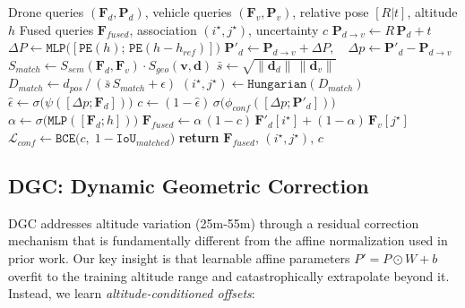 \documentclass[9.5pt,twocolumn,a4paper]{IEEEtran}
\def\mb#1{\mathbf{#1}}
\def\msc#1{\texttt{#1}}
\begin{document}
\begin{algorithm}[tb]
\caption{DGC + UGIM forward pass for one cooperative frame. Note the ordering: the altitude-aware correction (line 3) precedes association (line 6).}
\label{alg:pipeline}
\begin{algorithmic}[1]
\REQUIRE Drone queries $(\mb{F}_d, \mb{P}_d)$, vehicle queries $(\mb{F}_v, \mb{P}_v)$, relative pose $[R|t]$, altitude $h$
\ENSURE Fused queries $\mb{F}_{fused}$, association $(i^\star, j^\star)$, uncertainty $c$
\STATE $\mb{P}_{d\to v} \leftarrow R\,\mb{P}_d + t$ 
\STATE $\Delta P \leftarrow \msc{MLP}\big([\msc{PE}(h);\,\msc{PE}(h-h_{ref})]\big)$ 
\STATE $\mb{P}'_d \leftarrow \mb{P}_{d\to v} + \Delta P,\quad \Delta p \leftarrow \mb{P}'_d - \mb{P}_{d\to v}$
\STATE $S_{match} \leftarrow S_{sem}(\mb{F}_d, \mb{F}_v) \cdot S_{geo}(\mb{v}, \mb{d})$ 
\STATE $\bar{s} \leftarrow \sqrt{\|\mb{d}_d\|\,\|\mb{d}_v\|}$ 
\STATE $D_{match} \leftarrow d_{pos} \,/\, (\bar{s}\,S_{match} + \epsilon)$
\STATE $(i^\star, j^\star) \leftarrow \msc{Hungarian}(D_{match})$ 
\STATE $\hat\epsilon \leftarrow \sigma\big(\psi([\Delta p; \mb{F}_d])\big)$ 
\STATE $c \leftarrow (1-\hat\epsilon)\,\sigma\big(\phi_{conf}([\Delta p; \mb{P}'_d])\big)$ 
\STATE $\alpha \leftarrow \sigma\big(\msc{MLP}([\mb{F}_d; h])\big)$ 
\STATE $\mb{F}_{fused} \leftarrow \alpha\,(1-c)\,\mb{F}'_d[i^\star] + (1-\alpha)\,\mb{F}_v[j^\star]$
\STATE $\mathcal{L}_{conf} \leftarrow \msc{BCE}\big(c,\; 1-\msc{IoU}_{matched}\big)$
\STATE \textbf{return} $\mb{F}_{fused},\, (i^\star, j^\star),\, c$
\end{algorithmic}
\end{algorithm}

\subsection{DGC: Dynamic Geometric Correction}
\label{sec:dgc}

DGC addresses altitude variation (25m-55m) through a residual correction mechanism that is fundamentally different from the affine normalization used in prior work. Our key insight is that learnable affine parameters $P' = P \odot W + b$ overfit to the training altitude range and catastrophically extrapolate beyond it. Instead, we learn \emph{altitude-conditioned offsets}:
\end{document}

